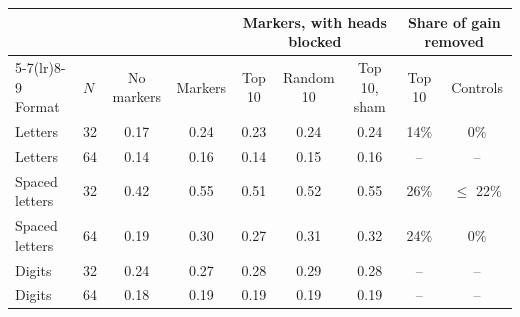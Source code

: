\begin{tabular}{llccccccc}
\toprule
& & & & \multicolumn{3}{c}{Markers, with heads blocked} & \multicolumn{2}{c}{Share of gain removed} \\
\cmidrule(lr){5-7}\cmidrule(lr){8-9}
Format & $N$ & No markers & Markers & Top 10 & Random 10 & Top 10, sham & Top 10 & Controls \\
\midrule
Letters & 32 & 0.17 & 0.24 & 0.23 & 0.24 & 0.24 & 14\% & 0\% \\
Letters & 64 & 0.14 & 0.16 & 0.14 & 0.15 & 0.16 & -- & -- \\
Spaced letters & 32 & 0.42 & 0.55 & 0.51 & 0.52 & 0.55 & 26\% & $\le$ 22\% \\
Spaced letters & 64 & 0.19 & 0.30 & 0.27 & 0.31 & 0.32 & 24\% & 0\% \\
Digits & 32 & 0.24 & 0.27 & 0.28 & 0.29 & 0.28 & -- & -- \\
Digits & 64 & 0.18 & 0.19 & 0.19 & 0.19 & 0.19 & -- & -- \\
\bottomrule
\end{tabular}
